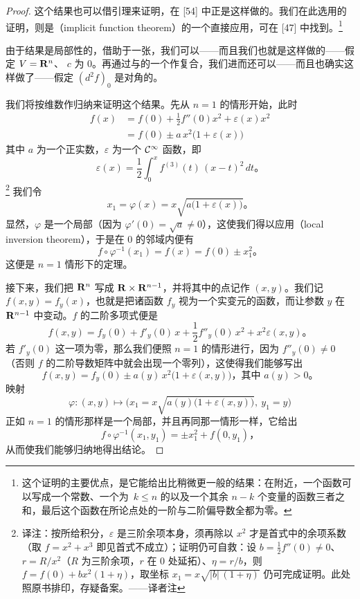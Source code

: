 \begin{proof}
这个结果也可以借\trHadamard{}引理来证明，\trMilnor{}在 [54] 中正是这样做的。我们在此选用的证明，则是\textbf{\trImplicitFunctionTheorem}（implicit function theorem）的一个直接应用，可在 [47] 中找到。\footnote{这个证明的主要优点，是它能给出比\trMorseLemma{}稍微更一般的结果：在\trCriticalPoint{}附近，一个函数可以写成一个常数、一个\trRank{}为~$k\leq n$ 的\trQuadraticForm{}以及一个其余 $n-k$ 个变量的函数三者之和，最后这个函数在所论点处的一阶与二阶偏导数全都为零。}

由于结果是局部性的，借助于一张\trChart，我们可以——而且我们也就是这样做的——假定 $V=\mathbf{R}^n$、\trCriticalPoint{} $c$ 为 $0$。再通过与\trVectorSpace{}的一个\trIsomorphism{}作复合，我们进而还可以——而且也确实这样做了——假定\trQuadraticForm{} $(d^2f)_0$ 是对角的。

我们将按维数作归纳来证明这个结果。先从 $n=1$ 的情形开始，此时
\[
\begin{aligned}
f(x)&=f(0)+\frac{1}{2}f''(0)x^2+\varepsilon(x)x^2\\
&=f(0)\pm a\,x^2\bigl(1+\varepsilon(x)\bigr)
\end{aligned}
\]
其中 $a$ 为一个正实数，$\varepsilon$ 为一个 $\mathcal{C}^\infty$ 函数，即
\[
\varepsilon(x)=\frac{1}{2}\int_0^x f^{(3)}(t)\,(x-t)^2\,dt\text{。}
\]
\footnote{译注：按所给积分，$\varepsilon$ 是三阶余项本身，须再除以 $x^{2}$ 才是首式中的余项系数（取 $f=x^{2}+x^{3}$ 即见首式不成立）；证明仍可自救：设 $b=\frac{1}{2}f''(0)\neq 0$、$r=R/x^{2}$（$R$ 为三阶余项，$r$ 在 $0$ 处\trSmooth{}延拓）、$\eta=r/b$，则 $f=f(0)+bx^{2}(1+\eta)$，取坐标 $x_{1}=x\sqrt{|b|\,(1+\eta)}$ 仍可完成证明。此处照原书排印，存疑备案。——译者注}
我们令
\[
x_1=\varphi(x)=x\sqrt{a\bigl(1+\varepsilon(x)\bigr)}\text{。}
\]
显然，$\varphi$ 是一个局部\trDiffeomorphism（因为 $\varphi'(0)=\sqrt{a}\neq 0$），这使我们得以应用\textbf{\trLocalInversionTheorem}（local inversion theorem），于是在 $0$ 的邻域内便有
\[
f\circ\varphi^{-1}(x_1)=f(x)=f(0)\pm x_1^2\text{。}
\]
这便是 $n=1$ 情形下的定理。

接下来，我们把 $\mathbf{R}^n$ 写成 $\mathbf{R}\times\mathbf{R}^{n-1}$，并将其中的点记作 $(x,y)$。我们记 $f(x,y)=f_y(x)$，也就是把诸函数 $f_y$ 视为一个实变元的函数，而让参数 $y$ 在 $\mathbf{R}^{n-1}$ 中变动。$f$ 的二阶\trTaylor{}多项式便是
\[
f(x,y)=f_y(0)+f'_y(0)\,x+\frac{1}{2}f''_y(0)\,x^2+x^2\varepsilon(x,y)\text{。}
\]
若 $f'_y(0)$ 这一项为零，那么我们便照 $n=1$ 的情形进行，因为 $f''_y(0)\neq 0$（否则 $f$ 的二阶导数矩阵中就会出现一个零列），这使得我们能够写出
\[
f(x,y)=f_y(0)\pm a(y)\,x^2\bigl(1+\varepsilon(x,y)\bigr)\text{，其中 }a(y)>0\text{。}
\]
映射
\[
\varphi\colon(x,y)\longmapsto
  \bigl(x_1=x\sqrt{a(y)\bigl(1+\varepsilon(x,y)\bigr)},\ y_1=y\bigr)
\]
正如 $n=1$ 的情形那样是一个局部\trDiffeomorphism，并且再同那一情形一样，它给出
\[
f\circ\varphi^{-1}(x_1,y_1)=\pm x_1^2+f(0,y_1)\text{，}
\]
从而使我们能够归纳地得出结论。


\end{proof}
